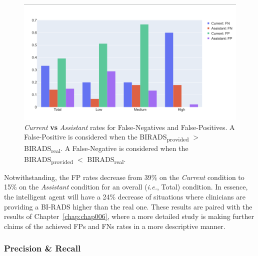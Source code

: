 \begin{figure}[ht]
\centering
\includegraphics[width=\columnwidth]{images/fig038}
\caption{{\it Current} {\bf vs} {\it Assistant} rates for False-Negatives and False-Positives. A False-Positive is considered when the BIRADS\textsubscript{provided} $>$ BIRADS\textsubscript{real}. A False-Negative is considered when the BIRADS\textsubscript{provided} $<$ BIRADS\textsubscript{real}.}
\label{fig:fig038}
\end{figure}

Notwithstanding, the \ac{FP} rates decrease from 39\% on the {\it Current} condition to 15\% on the {\it Assistant} condition for an overall ({\it i.e.}, Total) condition.
In essence, the intelligent agent will have a 24\% decrease of situations where clinicians are providing a \ac{BI-RADS} higher than the real one.
These results are paired with the results of Chapter~\ref{chap:chap006}, where a more detailed study is making further claims of the achieved \acp{FP} and \acp{FN} rates in a more descriptive manner.

\subsubsection{Precision \& Recall}
\label{sec:app002004004001}

